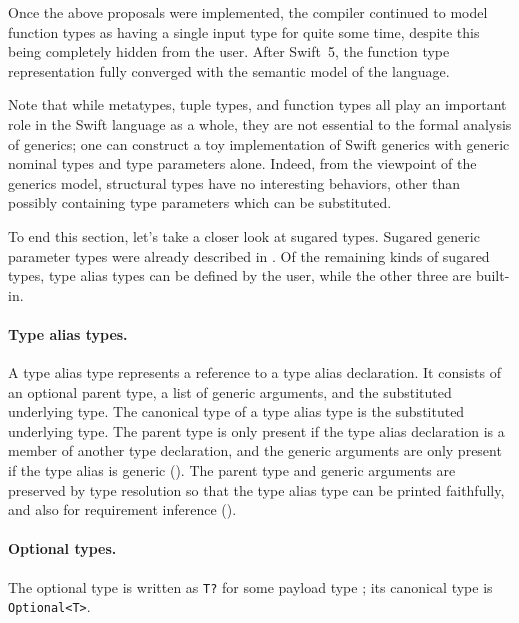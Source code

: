 \documentclass[../generics]{subfiles}
\begin{document}
Once the above proposals were implemented, the compiler continued to model function types as having a single input type for quite some time, despite this being completely hidden from the user. After Swift~5, the function type representation fully converged with the semantic model of the language.

Note that while metatypes, tuple types, and function types all play an important role in the Swift language as a whole, they are not essential to the formal analysis of generics; one can construct a toy implementation of Swift generics with generic nominal types and type parameters alone. Indeed, from the viewpoint of the generics model, structural types have no interesting behaviors, other than possibly containing type parameters which can be substituted.

\smallskip

To end this section, let's take a closer look at sugared types. Sugared generic parameter types were already described in . Of the remaining kinds of sugared types, type alias types can be defined by the user, while the other three are built-in.

\paragraph{Type alias types.} A type alias type represents a reference to a type alias declaration. It consists of an optional parent type, a list of generic arguments, and the substituted underlying type. The canonical type of a type alias type is the substituted underlying type. The parent type is only present if the type alias declaration is a member of another type declaration, and the generic arguments are only present if the type alias is generic (). The parent type and generic arguments are preserved by type resolution so that the type alias type can be printed faithfully, and also for requirement inference ().

\paragraph{Optional types.} The optional type is written as \texttt{T?} for some payload type \tT; its canonical type is \texttt{Optional<T>}.
\end{document}
